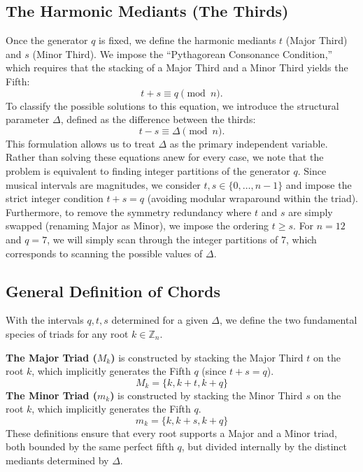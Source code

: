 \documentclass[12pt,letterpaper]{amsart}
\begin{document}
\subsection{The Harmonic Mediants (The Thirds)}
Once the generator $q$ is fixed, we define the harmonic mediants $t$ (Major Third) and $s$ (Minor Third). We impose the ``Pythagorean Consonance Condition,'' which requires that the stacking of a Major Third and a Minor Third yields the Fifth:
\begin{equation}
    t + s \equiv q \pmod n.
\end{equation}
To classify the possible solutions to this equation, we introduce the structural parameter $\Delta$, defined as the difference between the thirds:
\begin{equation}
    t - s \equiv \Delta \pmod n.
\end{equation}
This formulation allows us to treat $\Delta$ as the primary independent variable. Rather than solving these equations anew for every case, we note that the problem is equivalent to finding integer partitions of the generator $q$. Since musical intervals are magnitudes, we consider $t, s \in \{0, \dots, n-1\}$ and impose the strict integer condition $t+s=q$ (avoiding modular wraparound within the triad). Furthermore, to remove the symmetry redundancy where $t$ and $s$ are simply swapped (renaming Major as Minor), we impose the ordering $t \ge s$.
For $n=12$ and $q=7$, we will simply scan through the integer partitions of 7, which corresponds to scanning the possible values of $\Delta$.

\subsection{General Definition of Chords}
With the intervals $q, t, s$ determined for a given $\Delta$, we define the two fundamental species of triads for any root $k \in \mathbb{Z}_{n}$.

\textbf{The Major Triad ($M_k$)} is constructed by stacking the Major Third $t$ on the root $k$, which implicitly generates the Fifth $q$ (since $t+s=q$).
\begin{equation}
    M_k = \{k, k+t, k+q\}\label{maj}
\end{equation}
\textbf{The Minor Triad ($m_k$)} is constructed by stacking the Minor Third $s$ on the root $k$, which implicitly generates the Fifth $q$.
\begin{equation}
    m_k = \{k, k+s, k+q\}\label{min}
\end{equation}
These definitions ensure that every root supports a Major and a Minor triad, both bounded by the same perfect fifth $q$, but divided internally by the distinct mediants determined by $\Delta$.
\end{document}
